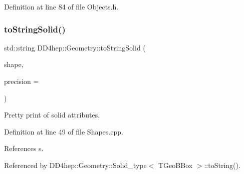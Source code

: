 Definition at line 84 of file Objects.\+h.

\hypertarget{namespace_d_d4hep_1_1_geometry_abd683b63937908cc4e95e3db3d4879a0}{}\label{namespace_d_d4hep_1_1_geometry_abd683b63937908cc4e95e3db3d4879a0} 
\subsubsection{\texorpdfstring{to\+String\+Solid()}{toStringSolid()}}
{\footnotesize\ttfamily std\+::string D\+D4hep\+::\+Geometry\+::to\+String\+Solid (\begin{DoxyParamCaption}\item[{const T\+Geo\+Shape $\ast$}]{shape,  }\item[{int}]{precision = {} }\end{DoxyParamCaption})}



Pretty print of solid attributes. 



Definition at line 49 of file Shapes.\+cpp.



References s.



Referenced by D\+D4hep\+::\+Geometry\+::\+Solid\+\_\+type$<$ T\+Geo\+B\+Box $>$\+::to\+String().

